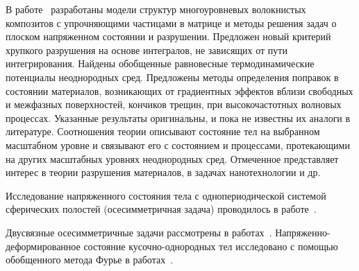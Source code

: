 В работе~\cite{Garishin} разработаны модели структур многоуровневых волокнистых композитов с упрочняющими частицами в матрице и методы решения задач о плоском напряженном состоянии и разрушении. Предложен новый критерий хрупкого разрушения на основе интегралов, не зависящих от пути интегрирования. Найдены обобщенные равновесные термодинамические потенциалы неоднородных сред. Предложены методы определения поправок в состоянии материалов, возникающих от градиентных эффектов вблизи свободных и межфазных поверхностей, кончиков трещин, при высокочастотных волновых процессах. Указанные результаты оригинальны, и пока не известны их аналоги в литературе. Соотношения теории описывают состояние тел на выбранном масштабном уровне и связывают его с состоянием и процессами, протекающими на других масштабных уровнях неоднородных сред. Отмеченное представляет интерес в теории разрушения материалов, в задачах нанотехнологии и др.

Исследование напряженного состояния тела с однопериодической системой сферических полостей (осесимметричная задача) проводилось в работе~\cite{Olegin}.

Двусвязные осесимметричные задачи рассмотрены в работах~\cite{Smirnov, Atsumi, Mura, Tsuchida1980, Tsuchida1979}. Напряженно-деформированное состояние кусочно-однородных тел исследовано с помощью обобщенного метода Фурье в работах~\cite{Nikolaev2003, Nikolaev2004, Nikolaev2011, Nikolaev2007, Nikolaev2010, Nikolaev2009, Nikolaev2013, Nikolaev2012, Nikolaev-Tanchik2012, Nikolaev2013-1, Nikolaev2013-2, Nikolaev2013-19, Nikolaev2013-4, Nikolaev2014-1, Nikolaev2014-9, Nikolaev2013-3, Nikolaev2014-2, Nikolaev2014-3, Nikolaev2014-4, Nikolaev2014-5, Nikolaev2014-6, Nikolaev2014-7, Nikolaev2015-1}.


